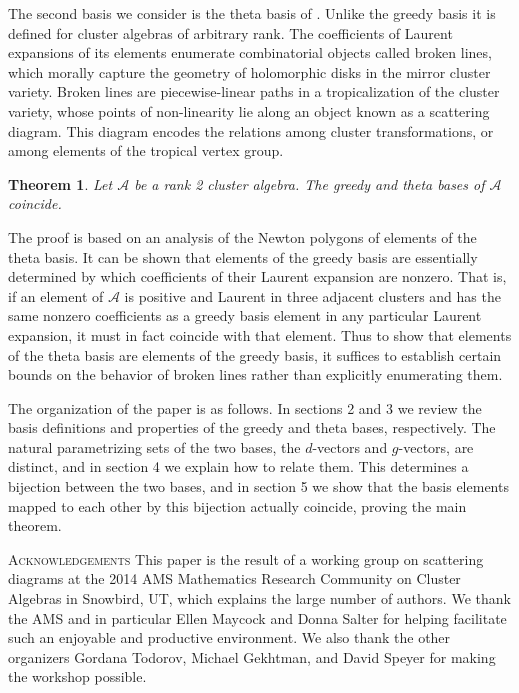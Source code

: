 \documentclass[10pt]{amsart}
\newtheorem{theorem}{Theorem}[section]
\theoremstyle{remark}
\numberwithin{equation}{section}
\begin{document}
The second basis we consider is the theta basis of \cite{GHKK}.  Unlike the greedy basis it is defined for cluster algebras of arbitrary rank.  The coefficients of Laurent expansions of its elements enumerate combinatorial objects called broken lines, which morally capture the geometry of holomorphic disks in the mirror cluster variety.  Broken lines are piecewise-linear paths in a tropicalization of the cluster variety, whose points of non-linearity lie along an object known as a scattering diagram.  This diagram encodes the relations among cluster transformations, or among elements of the tropical vertex group.

\begin{theorem}
Let $\mathcal{A}$ be a rank 2 cluster algebra.  The greedy and theta bases of $\mathcal{A}$ coincide.
\end{theorem}

The proof is based on an analysis of the Newton polygons of elements of the theta basis.  It can be shown that elements of the greedy basis are essentially determined by which coefficients of their Laurent expansion are nonzero.  That is, if an element of $\mathcal{A}$ is positive and Laurent in three adjacent clusters and has the same nonzero coefficients as a greedy basis element in any particular Laurent expansion, it must in fact coincide with that element.  Thus to show that elements of the theta basis are elements of the greedy basis, it suffices to establish certain bounds on the behavior of broken lines rather than explicitly enumerating them.

The organization of the paper is as follows.  In sections 2 and 3 we review the basis definitions and properties of the greedy and theta bases, respectively.  The natural parametrizing sets of the two bases, the $d$-vectors and $g$-vectors, are distinct, and in section 4 we explain how to relate them.  This determines a bijection between the two bases, and in section 5 we show that the basis elements mapped to each other by this bijection actually coincide, proving the main theorem.

\textsc{Acknowledgements} This paper is the result of a working group on scattering diagrams at the 2014 AMS Mathematics Research Community on Cluster Algebras in Snowbird, UT, which explains the large number of authors.  We thank the AMS and in particular Ellen Maycock and Donna Salter for helping facilitate such an enjoyable and productive environment.  We also thank the other organizers Gordana Todorov, Michael Gekhtman, and David Speyer for making the workshop possible.
\end{document}
